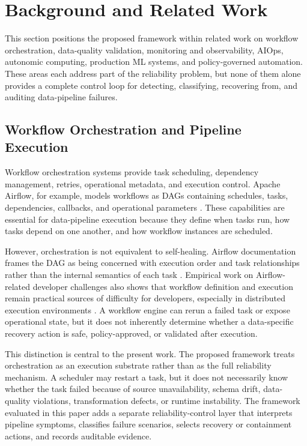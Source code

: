 \section{Background and Related Work}
\label{sec:background}

This section positions the proposed framework within related work on workflow orchestration, data-quality validation, monitoring and observability, AIOps, autonomic computing, production ML systems, and policy-governed automation. These areas each address part of the reliability problem, but none of them alone provides a complete control loop for detecting, classifying, recovering from, and auditing data-pipeline failures.

\subsection{Workflow Orchestration and Pipeline Execution}

Workflow orchestration systems provide task scheduling, dependency management, retries, operational metadata, and execution control. Apache Airflow, for example, models workflows as DAGs containing schedules, tasks, dependencies, callbacks, and operational parameters \cite{apacheairflowdags2026}. These capabilities are essential for data-pipeline execution because they define when tasks run, how tasks depend on one another, and how workflow instances are scheduled.

However, orchestration is not equivalent to self-healing. Airflow documentation frames the DAG as being concerned with execution order and task relationships rather than the internal semantics of each task \cite{apacheairflowdags2026}. Empirical work on Airflow-related developer challenges also shows that workflow definition and execution remain practical sources of difficulty for developers, especially in distributed execution environments \cite{yasmin2024airflow}. A workflow engine can rerun a failed task or expose operational state, but it does not inherently determine whether a data-specific recovery action is safe, policy-approved, or validated after execution.

This distinction is central to the present work. The proposed framework treats orchestration as an execution substrate rather than as the full reliability mechanism. A scheduler may restart a task, but it does not necessarily know whether the task failed because of source unavailability, schema drift, data-quality violations, transformation defects, or runtime instability. The framework evaluated in this paper adds a separate reliability-control layer that interprets pipeline symptoms, classifies failure scenarios, selects recovery or containment actions, and records auditable evidence.

